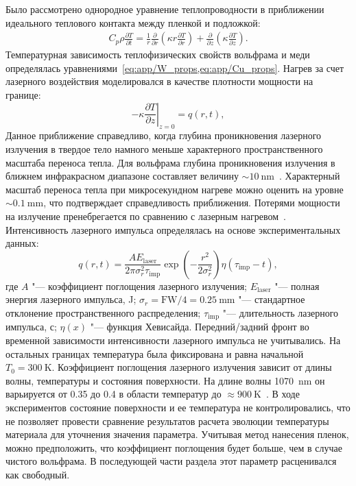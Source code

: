 Было рассмотрено однородное уравнение теплопроводности в приближении идеального теплового контакта между пленкой и подложкой:
\begin{align}
    C_p \rho \frac{\partial T}{\partial t} = \frac{1}{r}\frac{\partial}{\partial r}\left( \kappa r \frac{\partial T}{\partial r} \right) + \frac{\partial }{\partial z}\left( \kappa \frac{\partial T}{\partial z} \right).
\end{align}
Температурная зависимость теплофизических свойств вольфрама и меди определялась уравнениями~\cref{eq:app/W_props,eq:app/Cu_props}. Нагрев за счет лазерного воздействия моделировался в качестве плотности мощности на границе:
\begin{equation}
    -\kappa \left. \frac{\partial T}{\partial z} \right\vert_{z=0} = q(r, t),
\end{equation}
Данное приближение справедливо, когда глубина проникновения лазерного излучения в твердое тело намного меньше характерного пространственного масштаба переноса тепла. Для вольфрама глубина проникновения излучения в ближнем инфракрасном диапазоне составляет величину \( \sim \SI{10}{\nano\meter} \)~\cite{Ordal1988}. Характерный масштаб переноса тепла при микросекундном нагреве можно оценить на уровне \( \sim \SI{0.1}{\milli\meter} \), что подтверждает справедливость приближения. Потерями мощности на излучение пренебрегается по сравнению с лазерным нагревом~\cite{Stepanenko2024}. Интенсивность лазерного импульса определялась на основе экспериментальных данных:
\begin{equation}
    q(r,t)=\frac{A E_\mathrm{laser}}{2\pi \sigma_{r}^2\tau_\mathrm{imp}} \exp \left( -\frac{r^2}{2 \sigma_r^2} \right) \eta \left( \tau_\mathrm{imp}-t \right),
\end{equation}
где \(A \) "--- коэффициент поглощения лазерного излучения; $E_\mathrm{laser}$ "--- полная энергия лазерного импульса, \si{\joule}; $\sigma_r=\mathrm{FW}/4=\SI{0.25}{\milli\meter}$ "--- стандартное отклонение пространственного распределения; \( \tau_\mathrm{imp} \) "--- длительность лазерного импульса, с; \(\eta(x)\) "--- функция Хевисайда. Передний/задний фронт во временной зависимости интенсивности лазерного импульса не учитывались. На остальных границах температура была фиксирована и равна начальной \(T_0=\SI{300}{\kelvin}\). Коэффициент поглощения лазерного излучения зависит от длины волны, температуры и состояния поверхности. На длине волны \SI{1070}{\nano\meter} он варьируется от \num{0.35} до \num{0.4} в области температур до \( \approx \SI{900}{\kelvin} \)~\cite{Minissale2017}. В ходе экспериментов состояние поверхности и ее температура не контролировались, что не позволяет провести сравнение результатов расчета эволюции температуры материала для уточнения значения параметра. Учитывая метод нанесения пленок, можно предположить, что коэффициент поглощения будет больше, чем в случае чистого вольфрама. В последующей части раздела этот параметр расценивался как свободный.

